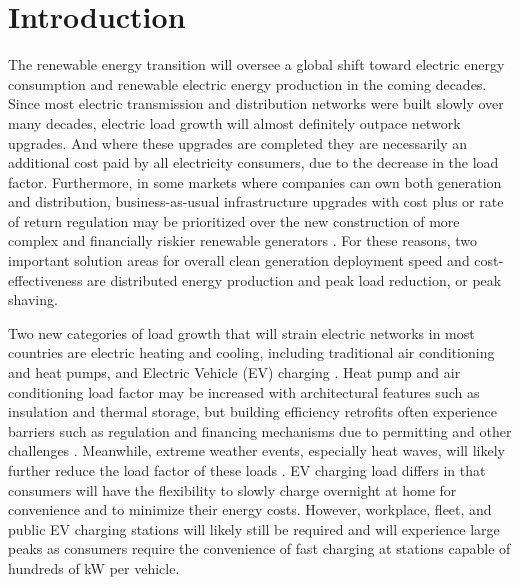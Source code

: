 \documentclass[journal,article,submit,pdftex,moreauthors]{Definitions/mdpi}
\begin{document}


\section{Introduction}\label{introduction}


The renewable energy transition will oversee a global shift toward electric energy consumption and renewable electric energy production in the coming decades. Since most electric transmission and distribution networks were built slowly over many decades, electric load growth will almost definitely outpace network upgrades. And where these upgrades are completed they are necessarily an additional cost paid by all electricity consumers, due to the decrease in the load factor. Furthermore, in some markets where companies can own both generation and distribution, business-as-usual infrastructure upgrades with cost plus or rate of return regulation may be prioritized over the new construction of more complex and financially riskier renewable generators \cite{Wagner2019}. For these reasons, two important solution areas for overall clean generation deployment speed and cost-effectiveness are distributed energy production and peak load reduction, or peak shaving.

Two new categories of load growth that will strain electric networks in most countries are electric heating and cooling, including traditional air conditioning and heat pumps, and Electric Vehicle (EV) charging \cite{Bobmann2015}. Heat pump and air conditioning load factor may be increased with architectural features such as insulation and thermal storage, but building efficiency retrofits often experience barriers such as regulation and financing mechanisms due to permitting and other challenges \cite{Bertone2016}. Meanwhile, extreme weather events, especially heat waves, will likely further reduce the load factor of these loads \cite{Villa2022}. EV charging load differs in that consumers will have the flexibility to slowly charge overnight at home for convenience and to minimize their energy costs. However, workplace, fleet, and public EV charging stations will likely still be required and will experience large peaks as consumers require the convenience of fast charging at stations capable of hundreds of kW per vehicle.
\end{document}
